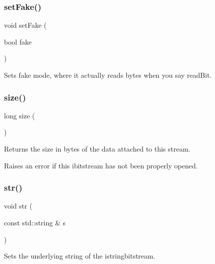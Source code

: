 \subsubsection{\texorpdfstring{set\+Fake()}{setFake()}}
{\footnotesize\ttfamily void set\+Fake (\begin{DoxyParamCaption}\item[{bool}]{fake }\end{DoxyParamCaption})\hspace{0.3cm}{\ttfamily [inherited]}}



Sets \textquotesingle{}fake\textquotesingle{} mode, where it actually reads bytes when you say read\+Bit. 

\mbox{\label{classibitstream_a22727e9c338fb1aaa6722031445373c3}} 
\subsubsection{\texorpdfstring{size()}{size()}}
{\footnotesize\ttfamily long size (\begin{DoxyParamCaption}{ }\end{DoxyParamCaption})\hspace{0.3cm}{\ttfamily [inherited]}}



Returns the size in bytes of the data attached to this stream. 

Raises an error if this ibitstream has not been properly opened. \mbox{\label{classistringbitstream_a4a07e41ddf13ced3f7e3997886b48805}} 
\subsubsection{\texorpdfstring{str()}{str()}}
{\footnotesize\ttfamily void str (\begin{DoxyParamCaption}\item[{const std\+::string \&}]{s }\end{DoxyParamCaption})}



Sets the underlying string of the istringbitstream. 

